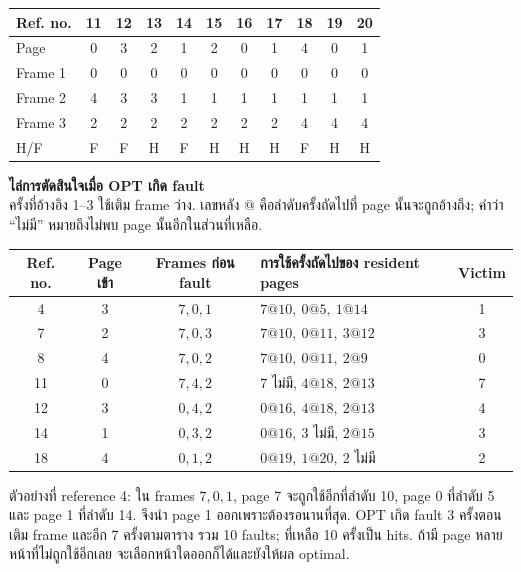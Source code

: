 {\setlength{\tabcolsep}{5pt}\begin{center}\renewcommand{\arraystretch}{1.15}\begin{tabular}{l|cccccccccc}
Ref. no. & 11 & 12 & 13 & 14 & 15 & 16 & 17 & 18 & 19 & 20\\\hline
Page & 0 & 3 & 2 & 1 & 2 & 0 & 1 & 4 & 0 & 1\\
Frame 1 & 0 & 0 & 0 & 0 & 0 & 0 & 0 & 0 & 0 & 0\\
Frame 2 & 4 & 3 & 3 & 1 & 1 & 1 & 1 & 1 & 1 & 1\\
Frame 3 & 2 & 2 & 2 & 2 & 2 & 2 & 2 & 4 & 4 & 4\\
H/F & F & F & H & F & H & H & H & F & H & H\\
\end{tabular}\end{center}}
\noindent\textbf{ไล่การตัดสินใจเมื่อ OPT เกิด fault}\\
ครั้งที่อ้างอิง 1--3 ใช้เติม frame ว่าง. เลขหลัง @ คือลำดับครั้งถัดไปที่ page นั้นจะถูกอ้างถึง; คำว่า ``ไม่มี'' หมายถึงไม่พบ page นั้นอีกในส่วนที่เหลือ.\par\smallskip
{\small\begin{center}\renewcommand{\arraystretch}{1.15}\begin{tabular}{c|c|c|p{5.2cm}|c}
Ref. no. & Page เข้า & Frames ก่อน fault & การใช้ครั้งถัดไปของ resident pages & Victim\\\hline
4 & 3 & $7,0,1$ & $7@10,\ 0@5,\ 1@14$ & 1\\
7 & 2 & $7,0,3$ & $7@10,\ 0@11,\ 3@12$ & 3\\
8 & 4 & $7,0,2$ & $7@10,\ 0@11,\ 2@9$ & 0\\
11 & 0 & $7,4,2$ & $7$ ไม่มี, $4@18,\ 2@13$ & 7\\
12 & 3 & $0,4,2$ & $0@16,\ 4@18,\ 2@13$ & 4\\
14 & 1 & $0,3,2$ & $0@16,\ 3$ ไม่มี, $2@15$ & 3\\
18 & 4 & $0,1,2$ & $0@19,\ 1@20,\ 2$ ไม่มี & 2\\
\end{tabular}\end{center}}
\noindent ตัวอย่างที่ reference 4: ใน frames $7,0,1$, page 7 จะถูกใช้อีกที่ลำดับ 10, page 0 ที่ลำดับ 5 และ page 1 ที่ลำดับ 14. จึงนำ page 1 ออกเพราะต้องรอนานที่สุด. OPT เกิด fault 3 ครั้งตอนเติม frame และอีก 7 ครั้งตามตาราง รวม 10 faults; ที่เหลือ 10 ครั้งเป็น hits. ถ้ามี page หลายหน้าที่ไม่ถูกใช้อีกเลย จะเลือกหน้าใดออกก็ได้และยังให้ผล optimal.\par
\newpage{}

